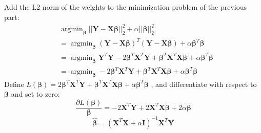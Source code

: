 \documentclass[11pt]{scrartcl} %
\DeclareMathOperator*{\argmin}{argmin}
\begin{document}
	\subsection{} %
		Add the L2 norm of the weights to the minimization problem of the previous part:
		\begin{equation}
			\begin{aligned}
				&\argmin_{\boldsymbol{\beta}} ||\boldsymbol{Y}-\boldsymbol{X\beta}||_2^2 
				+\alpha||\boldsymbol{\beta}||_2^2\\
				&=\argmin_{\boldsymbol{\beta}} (\boldsymbol{Y}-\boldsymbol{X\beta})^T (\boldsymbol{Y}-\boldsymbol{X\beta})+
				\alpha\boldsymbol{\beta}^T\boldsymbol{\beta}\\
				&=\argmin_{\boldsymbol{\beta}} \boldsymbol{Y}^T\boldsymbol{Y} - 2\boldsymbol{\beta}^T\boldsymbol{X}^T\boldsymbol{Y} +
				\boldsymbol{\beta}^T\boldsymbol{X}^T\boldsymbol{X\beta}+
				\alpha\boldsymbol{\beta}^T\boldsymbol{\beta}\\
				&=\argmin_{\boldsymbol{\beta}}  - 2\boldsymbol{\beta}^T\boldsymbol{X}^T\boldsymbol{Y} +
				\boldsymbol{\beta}^T\boldsymbol{X}^T\boldsymbol{X\beta}+
				\alpha\boldsymbol{\beta}^T\boldsymbol{\beta}
			\end{aligned}
		\end{equation}
		Define $L(\boldsymbol{\beta})=2\boldsymbol{\beta}^T\boldsymbol{X}^T\boldsymbol{Y} +
		\boldsymbol{\beta}^T\boldsymbol{X}^T\boldsymbol{X\beta}
		+\alpha\boldsymbol{\beta}^T\boldsymbol{\beta}$
		, and differentiate with respect to $\boldsymbol{\beta}$
		and set to zero:
		\begin{equation}
			\frac{\partial{L(\boldsymbol{\beta})}}{\boldsymbol{\beta}}=
			-2\boldsymbol{X}^T\boldsymbol{Y} + 2\boldsymbol{X}^T\boldsymbol{X}\boldsymbol{\beta}+
			2\alpha\boldsymbol{\beta}
		\end{equation}
		\begin{equation}
			\boldsymbol{\hat{\beta}} = (\boldsymbol{X}^T\boldsymbol{X} 
			+ \alpha\boldsymbol{I})^{-1}\boldsymbol{X}^T\boldsymbol{Y}
		\end{equation}
\end{document}
